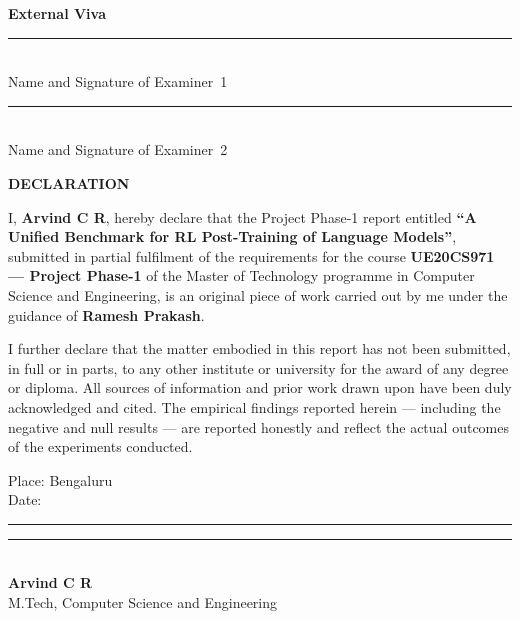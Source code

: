 \documentclass[12pt,a4paper]{report}
\begin{document}
\begin{center}
\textbf{External Viva}
\end{center}
\vspace{0.3em}
\noindent
\begin{minipage}[t]{0.48\linewidth}
\centering
\rule{5cm}{0.4pt}\\
Name and Signature of Examiner~1
\end{minipage}
\hfill
\begin{minipage}[t]{0.48\linewidth}
\centering
\rule{5cm}{0.4pt}\\
Name and Signature of Examiner~2
\end{minipage}

\clearpage
\thispagestyle{empty}
\begin{center}
{\Large\bfseries DECLARATION\par}
\end{center}
\vspace{1.0em}

I, \textbf{Arvind C R}, hereby declare that the Project Phase-1 report entitled
\textbf{``A Unified Benchmark for RL Post-Training of Language Models''},
submitted in partial fulfilment of the requirements for the course
\textbf{UE20CS971 --- Project Phase-1} of the Master of Technology programme in
Computer Science and Engineering, is an original piece of work carried out by me
under the guidance of \textbf{Ramesh Prakash}.

\vspace{0.6em}

I further declare that the matter embodied in this report has not been submitted,
in full or in parts, to any other institute or university for the award of any
degree or diploma. All sources of information and prior work drawn upon have been
duly acknowledged and cited. The empirical findings reported herein --- including
the negative and null results --- are reported honestly and reflect the actual
outcomes of the experiments conducted.

\vspace{3.0em}

\noindent
\begin{minipage}[t]{0.5\linewidth}
Place: Bengaluru\\[0.4em]
Date: \rule{3cm}{0.4pt}
\end{minipage}
\hfill
\begin{minipage}[t]{0.45\linewidth}
\centering
\vspace{1.2em}
\rule{5cm}{0.4pt}\\
\textbf{Arvind C R}\\
M.Tech, Computer Science and Engineering
\end{minipage}
\end{document}
